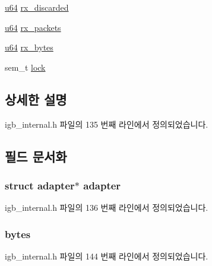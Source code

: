 \begin{DoxyCompactItemize}
\item 
\hyperlink{lib_2igb_2e1000__osdep_8h_a1d8f78f95a414480659f3182e6067b80}{u64} \hyperlink{structrx__ring_a8e02d86f1d47bd0e3c5b45ffb9ba9d79}{rx\+\_\+discarded}
\item 
\hyperlink{lib_2igb_2e1000__osdep_8h_a1d8f78f95a414480659f3182e6067b80}{u64} \hyperlink{structrx__ring_aa3bebfb174ded875865a321225aa30ac}{rx\+\_\+packets}
\item 
\hyperlink{lib_2igb_2e1000__osdep_8h_a1d8f78f95a414480659f3182e6067b80}{u64} \hyperlink{structrx__ring_a7959281142289cfe755e1b3279559b5f}{rx\+\_\+bytes}
\item 
sem\+\_\+t \hyperlink{structrx__ring_ac301e000199ad937f060277b0736d4e1}{lock}
\end{DoxyCompactItemize}


\subsection{상세한 설명}


igb\+\_\+internal.\+h 파일의 135 번째 라인에서 정의되었습니다.



\subsection{필드 문서화}
\subsubsection[{\texorpdfstring{adapter}{adapter}}]{\setlength{\rightskip}{0pt plus 5cm}struct {\bf adapter}$\ast$ {\bf adapter}}\hypertarget{structrx__ring_a807e6014970a3d469e197cd9ec25229c}{}\label{structrx__ring_a807e6014970a3d469e197cd9ec25229c}


igb\+\_\+internal.\+h 파일의 136 번째 라인에서 정의되었습니다.

\subsubsection[{\texorpdfstring{bytes}{bytes}}]{ bytes}\hypertarget{structrx__ring_a7056b21e5e7773c9205b38f00a3a75c2}{}\label{structrx__ring_a7056b21e5e7773c9205b38f00a3a75c2}


igb\+\_\+internal.\+h 파일의 144 번째 라인에서 정의되었습니다.

